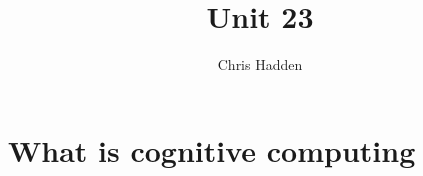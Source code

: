 \documentclass{article}
\title{Unit 23}
\author{Chris Hadden}
\date{}
\begin{document}
\maketitle

\section{What is cognitive computing}
\end{document}
